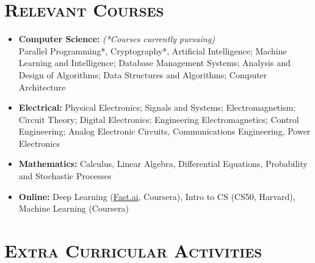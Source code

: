 \documentclass{article}
\newenvironment{longversion}{}{} %
\newcommand{\tmpsection}[1]{}
\let\tmpsection=\section
\renewcommand{\section}[1]{\tmpsection*{\textsc{#1}}}
\begin{document}
\begin{longversion}
\section{Relevant Courses}
\begin{itemize}
\setlength\itemsep{-1em}

\item \textbf{Computer Science:} \hfill \textit{(*Courses currently pursuing)}\\
Parallel Programming*, Cryptography*, Artificial Intelligence; Machine Learning and Intelligence; Database Management Systems; Analysis and Design of Algorithms; Data Structures and Algorithms; Computer Architecture\\

\item \textbf{Electrical:}
Physical Electronics; Signals and Systems; Electromagnetism; Circuit Theory; Digital Electronics; Engineering Electromagnetics; Control Engineering; Analog Electronic Circuits, Communications Engineering, Power Electronics\\ 

\item \textbf{Mathematics:} Calculus, Linear Algebra, Differential Equations, Probability and Stochastic Processes\\

\item \textbf{Online:}
Deep Learning (\href{http://www.fast.ai/}{Fast.ai}, Coursera), Intro to CS (CS50, Harvard), Machine Learning (Coursera)

\end{itemize}
\end{longversion}



\section{Extra Curricular Activities}
\end{document}
